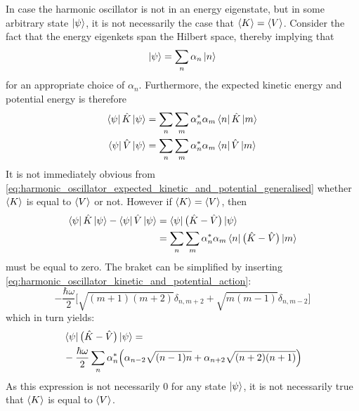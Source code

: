\documentclass[nofootinbib,reprint,english]{revtex4-1}
\begin{document}
In case the harmonic oscillator is not in an energy eigenstate, but in some arbitrary state \(\ket{\psi}\), it is not necessarily the case that \(\expval{K}=\expval{V}\). Consider the fact that the energy eigenkets span the Hilbert space, thereby implying that
\begin{equation}
\ket{\psi}=\sum_n\alpha_n\ket{n}
\end{equation}
for an appropriate choice of \(\alpha_n\). Furthermore, the expected kinetic energy and potential energy is therefore
\begin{subequations}\label{eq:harmonic_oscillator_expected_kinetic_and_potential_generalised}
\begin{align}
\bra{\psi}\hat{K}\ket{\psi}&=\sum_n\sum_m\alpha_n^*\alpha_m\bra{n}\hat{K}\ket{m}\\
\bra{\psi}\hat{V}\ket{\psi}&=\sum_n\sum_m\alpha_n^*\alpha_m\bra{n}\hat{V}\ket{m}
\end{align}
\end{subequations}
It is not immediately obvious from \eqref{eq:harmonic_oscillator_expected_kinetic_and_potential_generalised} whether \(\expval{K}\) is equal to \(\expval{V}\) or not. However if \(\expval{K}=\expval{V}\), then
\begin{align*}
\bra{\psi}\hat{K}\ket{\psi}-\bra{\psi}\hat{V}\ket{\psi}&=\bra{\psi}\big(\hat{K}-\hat{V}\big)\ket{\psi}\\
&=\sum_n\sum_m\alpha_n^*\alpha_m\bra{n}\big(\hat{K}-\hat{V}\big)\ket{m}
\end{align*}
must be equal to zero. The braket can be simplified by inserting \eqref{eq:harmonic_oscillator_kinetic_and_potential_action}:
\[-\frac{\hbar\omega}{2}\bigg[\sqrt{(m+1)(m+2)}\delta_{n,m+2}+\sqrt{m(m-1)}\delta_{n,m-2}\bigg]\]
which in turn yields:
\begin{align*}
&\bra{\psi}\big(\hat{K}-\hat{V}\big)\ket{\psi}=\\
&-\frac{\hbar\omega}{2}\sum_n\alpha_n^*\Big(\alpha_{n-2}\sqrt{(n-1)n}+\alpha_{n+2}\sqrt{(n+2)(n+1)}\Big)
\end{align*}
As this expression is not necessarily 0 for any state \(\ket{\psi}\), it is not necessarily true that \(\expval{K}\) is equal to \(\expval{V}\).
\end{document}
